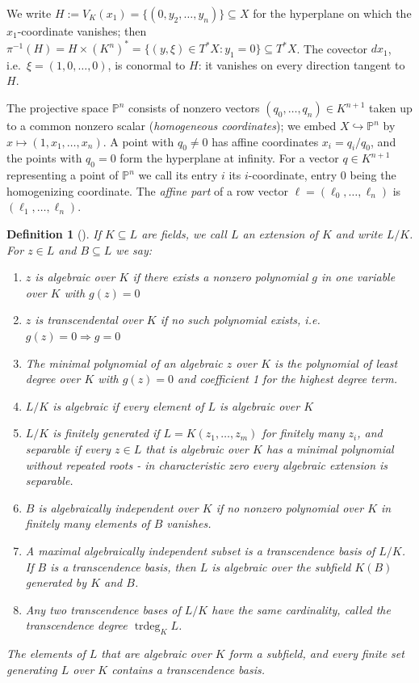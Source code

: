 \documentclass[pdflatex,sn-mathphys-num]{sn-jnl}
\numberwithin{equation}{section}
\theoremstyle{thmstyleone}
\newtheorem{definition}[theorem]{Definition}
\theoremstyle{thmstyletwo}
\begin{document}
We write $H:=V_K(x_1)=\{(0,y_2,\dots,y_n)\}\subseteq X$ for the hyperplane on
which the $x_1$-coordinate vanishes; then $\pi^{-1}(H)=H\times (K^n)^* = \{(y,\xi)\in T^*X:y_1 = 0\}\subseteq T^*X$.
The covector $dx_1$, i.e.\ $\xi=(1,0,\dots,0)$, is conormal to $H$: it vanishes
on every direction tangent to $H$.

The projective space $\mathbb P^n$ consists of nonzero vectors
$(q_0,\dots,q_n)\in K^{n+1}$ taken up to a common nonzero scalar (\emph{homogeneous
coordinates}); we embed $X\hookrightarrow\mathbb P^n$ by $x\mapsto(1,x_1,\dots,x_n)$. A
point with $q_0\neq0$ has affine coordinates $x_i=q_i/q_0$, and the points with
$q_0=0$ form the hyperplane at infinity. For a vector $q\in K^{n+1}$ representing a point
of $\mathbb P^n$ we call its entry $i$ its $i$-coordinate, entry $0$ being the
homogenizing coordinate. The \emph{affine part} of a row vector
$\ell=(\ell_0,\dots,\ell_n)$ is $(\ell_1,\dots,\ell_n)$.
\begin{definition}[{\cite[VIII.1, V]{lang}}]\label{def:fieldextension}
If $K\subseteq L$ are fields, we call $L$ an extension of $K$ and write $L/K$. For $z\in L$ and $B\subseteq L$ we say:
\begin{enumerate}
\item $z$ is \emph{algebraic over $K$} if there exists a nonzero polynomial $g$
in one variable over $K$ with $g(z)=0$
\item $z$ is \emph{transcendental over $K$} if no such polynomial exists, i.e.\
$g(z)=0\Rightarrow g=0$
\item The \emph{minimal polynomial} of an algebraic $z$ over $K$ is the polynomial of
least degree over $K$ with $g(z)=0$ and coefficient 1 for the highest degree term.
\item $L/K$ is \emph{algebraic} if every element of $L$ is algebraic over $K$
\item $L/K$ is \emph{finitely generated} if $L=K(z_1,\dots,z_m)$ for
  finitely many $z_i$, and \emph{separable} if every $z\in L$ that is algebraic over
  $K$ has a minimal polynomial without repeated roots - in characteristic zero every
  algebraic extension is separable.
\item $B$ is \emph{algebraically independent} over $K$ if
no nonzero polynomial over $K$ in finitely many elements of $B$ vanishes.
\item A maximal algebraically independent subset is a \emph{transcendence basis} of
$L/K$. If $B$ is a transcendence basis, then $L$ is algebraic over the subfield
$K(B)$ generated by $K$ and $B$. 
\item Any two transcendence bases of $L/K$ have the
same cardinality, called the \emph{transcendence degree} $\operatorname{trdeg}_KL$.
\end{enumerate}
The elements of $L$ that are algebraic over $K$ form a subfield, and every
finite set generating $L$ over $K$ contains a transcendence basis.
\end{definition}
\end{document}
